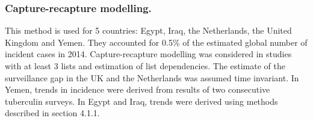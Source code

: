 \subsubsection {Capture-recapture modelling.} This method is used for 5 countries: Egypt\cite{20487611}, Iraq\cite{23485379}, the Netherlands\cite{17156496}, the United Kingdom\cite{Anderson2010} and Yemen\cite{23485378}. They accounted for 0.5\% of the estimated global number of incident cases in 2014. Capture-recapture modelling was considered in studies with at least 3 lists and estimation of list dependencies\cite{WHO2012}. The estimate of the surveillance gap in the UK and the Netherlands was assumed time invariant. In Yemen, trends in incidence were derived from results of two consecutive tuberculin surveys\cite{19723398}. In Egypt and Iraq, trends were derived using methods described in section 4.1.1.

